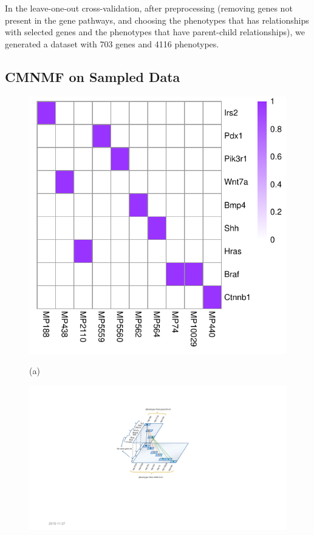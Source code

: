 \documentclass{bmcart}
\begin{document}
In the leave-one-out cross-validation, after preprocessing (removing genes not present in the gene pathways, and choosing the phenotypes that has relationships with selected genes and the phenotypes that have parent-child relationships), we generated a dataset with 703 genes and 4116 phenotypes.
\subsection*{\textbf{CMNMF on Sampled Data}}
\begin{figure}[!h]
  \centering
  \begin{minipage}[b]{.40\linewidth}
   \includegraphics[width=\linewidth]{DrawPictures/v_4.pdf}
    \centerline{(a)}
  \end{minipage}
   \begin{minipage}[b]{.45\linewidth}
   \includegraphics[width=\linewidth]{DrawPictures/Hierarchica.pdf}

\end{minipage}
\end{figure}
\end{document}
